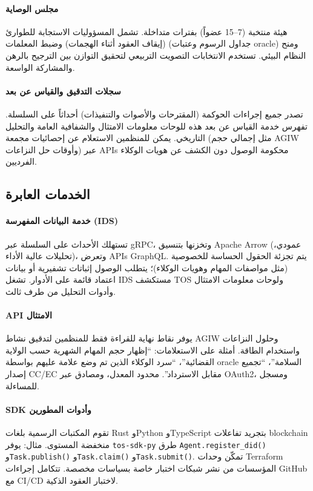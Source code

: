 \documentclass[11pt]{article}
\begin{document}
\paragraph{مجلس الوصاية} هيئة منتخبة (7--15 عضواً) بفترات متداخلة. تشمل المسؤوليات الاستجابة للطوارئ (إيقاف العقود أثناء الهجمات) وضبط المعلمات (جداول الرسوم وعتبات oracle) ومنح النظام البيئي. تستخدم الانتخابات التصويت التربيعي لتحقيق التوازن بين الترجيح بالرهن والمشاركة الواسعة.

\paragraph{سجلات التدقيق والقياس عن بعد} تصدر جميع إجراءات الحوكمة (المقترحات والأصوات والتنفيذات) أحداثاً على السلسلة. تفهرس خدمة القياس عن بعد هذه للوحات معلومات الامتثال والشفافية العامة والتحليل التاريخي. يمكن للمنظمين الاستعلام عن إحصائيات مجمعة (مثل إجمالي حجم AGIW وأوقات حل النزاعات) عبر APIs محكومة الوصول دون الكشف عن هويات الوكلاء الفرديين.

\subsection{الخدمات العابرة}
\paragraph{خدمة البيانات المفهرسة (IDS)} تستهلك الأحداث على السلسلة عبر gRPC، وتخزنها بتنسيق Apache Arrow (عمودي، تحليلات عالية الأداء)، وتعرض APIs GraphQL. يتم تجزئة الحقول الحساسة للخصوصية (مثل مواصفات المهام وهويات الوكلاء)؛ يتطلب الوصول إثباتات تشفيرية أو بيانات اعتماد قائمة على الأدوار. تشغل IDS مستكشف TOS ولوحات معلومات الامتثال وأدوات التحليل من طرف ثالث.

\paragraph{API الامتثال} يوفر نقاط نهاية للقراءة فقط للمنظمين لتدقيق نشاط AGIW وحلول النزاعات واستخدام الطاقة. أمثلة على الاستعلامات: ``إظهار حجم المهام الشهرية حسب الولاية القضائية''، ``سرد الوكلاء الذين تم وضع علامة عليهم بواسطة oracle السلامة''، ``تجميع إصدار CC/EC مقابل الاسترداد''. محدود المعدل، ومصادق عبر OAuth2، ومسجل للمساءلة.

\paragraph{SDK وأدوات المطورين} تقوم المكتبات الرسمية بلغات Rust وPython وTypeScript بتجريد تفاعلات blockchain منخفضة المستوى. مثال: يوفر \texttt{tos-sdk-py} طرق \texttt{Agent.register\_did()} و\texttt{Task.publish()} و\texttt{Task.claim()} و\texttt{Task.submit()}. تمكّن وحدات Terraform المؤسسات من نشر شبكات اختبار خاصة بسياسات مخصصة. تتكامل إجراءات GitHub مع CI/CD لاختبار العقود الذكية.
\end{document}
